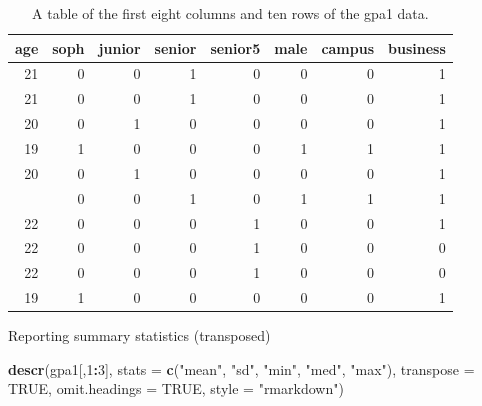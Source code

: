 \documentclass[]{book}
\newenvironment{Shaded}{\begin{snugshade}}{\end{snugshade}}
\newcommand{\DataTypeTok}[1]{\textcolor[rgb]{0.13,0.29,0.53}{#1}}
\newcommand{\DecValTok}[1]{\textcolor[rgb]{0.00,0.00,0.81}{#1}}
\newcommand{\KeywordTok}[1]{\textcolor[rgb]{0.13,0.29,0.53}{\textbf{#1}}}
\newcommand{\NormalTok}[1]{#1}
\newcommand{\OperatorTok}[1]{\textcolor[rgb]{0.81,0.36,0.00}{\textbf{#1}}}
\newcommand{\OtherTok}[1]{\textcolor[rgb]{0.56,0.35,0.01}{#1}}
\newcommand{\StringTok}[1]{\textcolor[rgb]{0.31,0.60,0.02}{#1}}
\begin{document}
\begin{table}

\caption{\label{tab:unnamed-chunk-73}A table of the first eight columns and ten rows of the gpa1 data.}
\centering
\begin{tabular}[t]{rrrrrrrr}
\toprule
age & soph & junior & senior & senior5 & male & campus & business\\
\midrule
21 & 0 & 0 & 1 & 0 & 0 & 0 & 1\\
21 & 0 & 0 & 1 & 0 & 0 & 0 & 1\\
20 & 0 & 1 & 0 & 0 & 0 & 0 & 1\\
19 & 1 & 0 & 0 & 0 & 1 & 1 & 1\\
20 & 0 & 1 & 0 & 0 & 0 & 0 & 1\\
\addlinespace
20 & 0 & 0 & 1 & 0 & 1 & 1 & 1\\
22 & 0 & 0 & 0 & 1 & 0 & 0 & 1\\
22 & 0 & 0 & 0 & 1 & 0 & 0 & 0\\
22 & 0 & 0 & 0 & 1 & 0 & 0 & 0\\
19 & 1 & 0 & 0 & 0 & 0 & 0 & 1\\
\bottomrule
\end{tabular}
\end{table}

Reporting summary statistics (transposed)

\begin{Shaded}
\begin{Highlighting}[]
\KeywordTok{descr}\NormalTok{(gpa1[,}\DecValTok{1}\OperatorTok{:}\DecValTok{3}\NormalTok{], }\DataTypeTok{stats =} \KeywordTok{c}\NormalTok{(}\StringTok{"mean"}\NormalTok{, }\StringTok{"sd"}\NormalTok{, }\StringTok{"min"}\NormalTok{, }\StringTok{"med"}\NormalTok{, }\StringTok{"max"}\NormalTok{), }\DataTypeTok{transpose =} \OtherTok{TRUE}\NormalTok{, }
      \DataTypeTok{omit.headings =} \OtherTok{TRUE}\NormalTok{, }\DataTypeTok{style =} \StringTok{"rmarkdown"}\NormalTok{)}
\end{Highlighting}
\end{Shaded}
\end{document}
